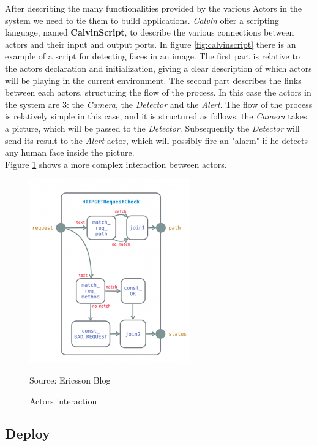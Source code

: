 \begin{itemize}
  After describing the many functionalities provided by the various Actors in the system
  we need to tie them to build applications. \textit{Calvin} offer a scripting language,
  named \textbf{CalvinScript}, to describe the various connections between actors
  and their input and output ports. In figure \ref{fig:calvinscript} there is an example
  of a script for detecting faces in an image. The first part is relative to the actors declaration
  and initialization, giving a clear description of which actors will be playing in the current
  environment. The second part describes the links between each actors, structuring the flow
  of the process. In this case the actors in the system are 3: the \textit{Camera}, the \textit{Detector}
  and the \textit{Alert}. The flow of the process is relatively simple in this case, and it is structured
  as follows: the  \textit{Camera} takes a picture, which will be passed to the \textit{Detector}. Subsequently
  the \textit{Detector} will send its result to the \textit{Alert} actor, which will possibly fire an "alarm" if he
  detects any human face inside the picture.\\
  Figure \ref{fig:calvinactors} shows a more complex interaction between actors. %

  \begin{figure}[h]
  \caption{Actors interaction}

  \label{fig:calvinactors}
  \centering
  \includegraphics[scale=0.75]{calvin3.png}
  \par{Source: Ericsson Blog}
  \end{figure}



\subsection{Deploy}


\end{itemize}

